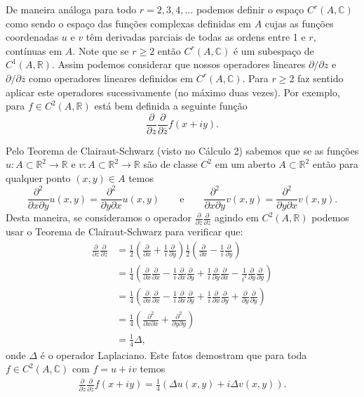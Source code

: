 \bigskip 


De maneira análoga para todo $r=2,3,4,\ldots$ podemos definir o espaço $C^r(A,\mathbb{C})$ 
como sendo o espaço das funções complexas definidas em $A$ cujas as funções coordenadas
$u$ e $v$ têm derivadas parciais de todas as ordens entre 1 e $r$, contínuas em $A$. Note que 
se $r\geqslant 2$ então $C^r(A,\mathbb{C})$ é um subespaço de $C^1(A,\mathbb{R})$.
Assim podemos considerar que nossos operadores lineares $\partial /\partial z$ e $\partial/\partial\overline{z}$
como operadores lineares definidos em $C^r(A,\mathbb{C})$. Para $r\geqslant 2$ faz sentido aplicar 
este operadores sucessivamente (no máximo duas vezes). 
Por exemplo, para $f\in C^2(A,\mathbb{R})$ está bem definida a seguinte 
função
\[
\frac{\partial}{\partial z} \frac{\partial}{\partial \overline{z}} f(x+iy).
\] 

Pelo Teorema de Clairaut-Schwarz (visto no Cálculo 2) 
sabemos que se as funções $u:A\subset\mathbb{R}^2\to\mathbb{R}$ e $v:A\subset\mathbb{R}^2\to\mathbb{R}$ 
são de classe $C^2$ em um aberto $A\subset\mathbb{R}^2$
então para qualquer ponto $(x,y)\in A$ temos
\[
\frac{\partial^2}{\partial x\partial y}u(x,y) = \frac{\partial^2}{\partial y\partial x}u(x,y)
\qquad\text{e}\qquad 
\frac{\partial^2}{\partial x\partial y}v(x,y) = \frac{\partial^2}{\partial y\partial x}v(x,y).
\]
Desta maneira, se consideramos o operador $\frac{\partial}{\partial z} \frac{\partial}{\partial \overline{z}}$ 
agindo em $C^2(A,\mathbb{R})$ podemos usar o  Teorema de Clairaut-Schwarz  para verificar que:
\begin{align*}
\frac{\partial}{\partial z} \frac{\partial}{\partial \overline{z}}
&=
\frac{1}{2}\left( \frac{\partial}{\partial x}+ \frac{1}{i}\frac{\partial}{\partial y} \right)
\frac{1}{2}\left( \frac{\partial}{\partial x}-\frac{1}{i}\frac{\partial  }{\partial y} \right)
\\
&=
\frac{1}{4}
\left( 
	\frac{\partial}{\partial x} \frac{\partial}{\partial x} 
	-
	\frac{1}{i}\frac{\partial}{\partial x}\frac{\partial  }{\partial y}
	+
	\frac{1}{i}\frac{\partial}{\partial y}\frac{\partial}{\partial x}
	-
	\frac{1}{i^2}\frac{\partial}{\partial y} \frac{\partial  }{\partial y}
\right)
\\
&=
\frac{1}{4}
\left( 
\frac{\partial}{\partial x} \frac{\partial}{\partial x} 
-
\frac{1}{i}\frac{\partial}{\partial x}\frac{\partial  }{\partial y}
+
\frac{1}{i}\frac{\partial}{\partial x}\frac{\partial}{\partial y}
+
\frac{\partial}{\partial y} \frac{\partial  }{\partial y}
\right)
\\
&=
\frac{1}{4}\left( \frac{\partial^2}{\partial x\partial x} + \frac{\partial^2}{\partial y\partial y}   \right)
\\
&=
\frac{1}{4} \Delta,
\end{align*}
onde $\Delta$ é o operador Laplaciano. Este fatos demostram que para toda $f\in C^2(A,\mathbb{C})$
com $f=u+iv$  temos
\begin{align}\label{eq-aux-CR-harmonica}
\frac{\partial}{\partial z} \frac{\partial}{\partial \overline{z}} f(x+iy)
=
\frac{1}{4}(\Delta u(x,y)+ i \Delta v(x,y)).
\end{align}

